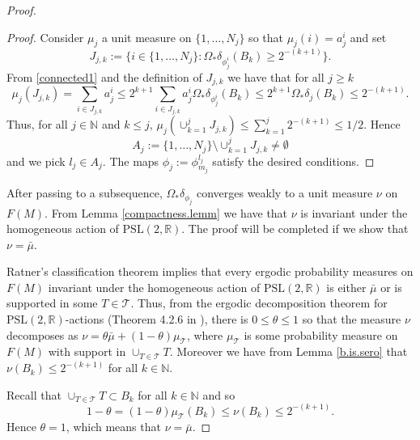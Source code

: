 \documentclass[11pt]{amsart}
\def\R{\mathbb R}
\def\N{\mathbb N}
\theoremstyle{remark}
\theoremstyle{definition}
\begin{document}
{{\begin{proof}
\begin{proof}
			Consider $\mu_j$ a unit measure on $\{1,\ldots,N_j\}$ so that $\mu_j(i)=a^i_j$ and set
			$$J_{j,k}:=\{i\in \{1,\ldots,N_j\}: \Omega_*\delta_{\phi^i_j}(B_k)\geq 2^{-(k+1)}\}.$$
			From \eqref{connected1} and the definition of $J_{j,k}$ we have that for all $j\geq k$
			$$
			\mu_j(J_{j,k})=\sum_{i\in J_{j,k}}a^i_j\leq 2^{k+1}\sum_{i\in J_{j,k}}a^i_j \Omega_*\delta_{\phi^i_j}(B_k)
			\leq  2^{k+1}\Omega_*\delta_j(B_k)\leq 2^{-(k+1)}.
			$$
			Thus, for all $j\in\N$ and $k\leq j$,
			$\mu_j(\cup_{k=1}^jJ_{j,k})\leq \sum_{k=1}^j2^{-(k+1)}\leq 1/2.$
			Hence $$A_j:=\{1,\ldots,N_j\}\setminus\cup_{k=1}^jJ_{j,k}\neq \emptyset $$
			and we pick $l_j\in A_j$. The maps $\phi_j:=\phi^{l_j}_{m_j}$ satisfy the desired conditions.
		\end{proof}
		
		
		After passing to a subsequence, $\Omega_*\delta_{\phi_j}$ converges weakly to a unit measure $\nu$ on $F(M)$. From Lemma \ref{compactness.lemm} we have that $\nu$ is  invariant under  the homogeneous action of $\text{PSL}(2,\R)$.  The proof will be completed if we show that $\nu={\bar\mu}$.
		
		Ratner's classification theorem \cite{ratner} implies that every ergodic probability measures on $F(M)$ invariant under  the homogeneous action of $\text{PSL}(2,\R)$ is either ${\bar\mu}$ or is supported in some $T\in \mathcal T$. Thus, from the ergodic decomposition theorem for $\text{PSL}(2,\R)$-actions  (Theorem 4.2.6 in \cite{katok}), there is $0\leq \theta\leq 1$ so that the measure $\nu$ decomposes as  $\nu=\theta{\bar\mu}+(1-\theta)\mu_{\mathcal T}$, where $\mu_{\mathcal T}$ is some  probability measure on $F(M)$ with support in $\cup_{T\in\mathcal T}T$. Moreover we have from 
		Lemma \ref{b.is.sero} that $\nu(B_k)\leq 2^{-(k+1)}$ for all $k\in\N$. 
		
		Recall that $\cup_{T\in\mathcal T}T\subset B_{k}$ for all $k \in\N$ and so
		$$1-\theta=(1-\theta)\mu_{\mathcal T}(B_k)\leq  \nu(B_k)\leq 2^{-(k+1)}.$$
		Hence $\theta=1$, which means that $\nu={\bar\mu}$.
	\end{proof}
	
}}
\end{document}
